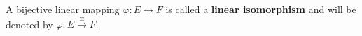 A bijective linear mapping $\varphi: E \rightarrow F$ is called a \textbf{linear isomorphism} and will be denoted by $\varphi: E \xrightarrow{\cong} F$.
